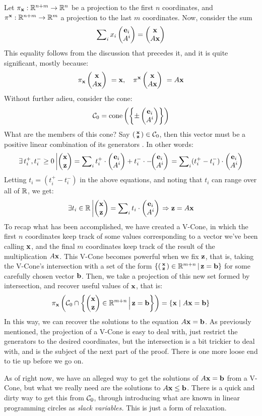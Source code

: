 Let $\pi_{\mathbf{x}} : \mathbb{R}^{n+m} \to \mathbb{R}^{n}$ be a projection to the first $n$ coordinates, and $\pi^{\mathbf{x}} : \mathbb{R}^{n+m} \to \mathbb{R}^{m}$ a projection to the last $m$ coordinates.  Now, consider the sum 
  \[ \sum\nolimits_i x_i \begin{pmatrix}\mathbf{e}_i \\ A^i\end{pmatrix} = \begin{pmatrix}\mathbf{x} \\ A\mathbf{x}\end{pmatrix} \]
This equality follows from the discussion that precedes it, and it is quite significant, mostly because:
  \[ \pi_{\mathbf{x}} \begin{pmatrix}\mathbf{x} \\ A\mathbf{x}\end{pmatrix}\ = \mathbf{x},\quad \pi^{\mathbf{x}} \begin{pmatrix}\mathbf{x} \\ A\mathbf{x}\end{pmatrix}\ = A\mathbf{x} \]
Without further adieu, consider the cone:
  \[ \mathcal{C}_0 = \operatorname{cone}\left(\left\{\pm\begin{pmatrix}\mathbf{e}_i \\ A^i\end{pmatrix}\right\}\right) \]
What are the members of this cone?  Say $\left(\begin{smallmatrix}\mathbf{x} \\ \mathbf{z}\end{smallmatrix}\right) \in \mathcal{C}_0$, then this vector must be a positive linear combination of its generators .  In other words:
  \[ \exists\, t^+_i, t^-_i \geq 0 \left| \begin{pmatrix}\mathbf{x} \\ \mathbf{z}\end{pmatrix} = 
       \sum\nolimits_i t^+_i \cdot\begin{pmatrix}\mathbf{e}_i \\ A^i\end{pmatrix} + 
                       t^-_i \cdot{-\!\!\begin{pmatrix}\mathbf{e}_i \\ A^i\end{pmatrix}} \right. =
       \sum\nolimits_i (t^+_i - t^-_i) \cdot\begin{pmatrix}\mathbf{e}_i \\ A^i\end{pmatrix}
   \]
Letting $t_i = (t^+_i - t^-_i)$ in the above equations, and noting that $t_i$ can range over all of $\mathbb{R}$, we get:
  \[ \exists t_i \in \mathbb{R} \left| \begin{pmatrix}\mathbf{x} \\ \mathbf{z}\end{pmatrix} = \sum\nolimits_i t_i \cdot\begin{pmatrix}\mathbf{e}_i \\ A^i\end{pmatrix} \right.
       \Rightarrow \mathbf{z} = A\mathbf{x} \]
To recap what has been accomplished, we have created a V-Cone, in which the first $n$ coordinates keep track of some values corresponding to a vector we've been calling $\mathbf{x}$, and the final $m$ coordinates keep track of the result of the multiplication $A\mathbf{x}$.  This V-Cone becomes powerful when we fix $\mathbf{z}$, that is, taking the V-Cone's intersection with a set of the form $\left\{\left(\begin{smallmatrix}\mathbf{x} \\ \mathbf{z}\end{smallmatrix}\right) \in \mathbb{R}^{m+n} \,|\, \mathbf{z} = \mathbf{b}\right\}$ for some carefully chosen vector $\mathbf{b}$.  Then, we take a projection of this new set formed by intersection, and recover useful values of $\mathbf{x}$, that is:
  \[ \pi_{\mathbf{x}}\left(\mathcal{C}_0 \cap 
             \left\{\begin{pmatrix}\mathbf{x} \\ \mathbf{z}\end{pmatrix} \in \mathbb{R}^{m+n} \,\Big|\, \mathbf{z} = \mathbf{b}\right\} \right) =
     \left\{\mathbf{x} \;|\; A\mathbf{x} = \mathbf{b}\right\} 
  \]
In this way, we can recover the solutions to the equation $A\mathbf{x} = \mathbf{b}$.  As previously mentioned, the projection of a V-Cone is easy to deal with, just restrict the generators to the desired coordinates, but the intersection is a bit trickier to deal with, and is the subject of the next part of the proof.  There is one more loose end to tie up before we go on.

As of right now, we have an alleged way to get the solutions of $A\mathbf{x} = \mathbf{b}$ from a V-Cone, but what we really need are the solutions to $A\mathbf{x} \leq \mathbf{b}$.  There is a quick and dirty way to get this from $\mathcal{C}_0$, through introducing what are known in linear programming circles as \textit{slack variables.}  This is just a form of relaxation.

